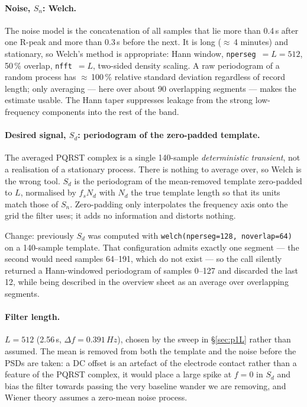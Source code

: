 \documentclass[11pt,a4paper]{article}
\newcommand{\hertz}{Hz}
\newcommand{\second}{s}
\newcommand{\percent}{\%}
\newcommand{\num}[1]{#1}
\newcommand{\numrange}[2]{#1--#2}
\newcommand{\SI}[2]{#1\,#2}
\newcommand{\change}[1]{\textcolor{black!70}{\textsf{\footnotesize #1}}}
\begin{document}
\paragraph{Noise, $S_n$: Welch.} The noise model is the concatenation of all samples that lie
more than \SI{0.4}{\second} after one R-peak and more than \SI{0.3}{\second} before the next.
It is long ($\approx$\,4 minutes) and stationary, so Welch's method is appropriate: Hann
window, \texttt{nperseg}~$=L=512$, \SI{50}{\percent} overlap, \texttt{nfft}~$=L$, two-sided
density scaling. A raw periodogram of a random process has $\approx$\,\SI{100}{\percent}
relative standard deviation regardless of record length; only averaging --- here over about
90 overlapping segments --- makes the estimate usable. The Hann taper suppresses leakage from
the strong low-frequency components into the rest of the band.

\paragraph{Desired signal, $S_d$: periodogram of the zero-padded template.} The averaged
PQRST complex is a single \num{140}-sample \emph{deterministic transient}, not a realisation
of a stationary process. There is nothing to average over, so Welch is the wrong tool. $S_d$
is the periodogram of the mean-removed template zero-padded to $L$, normalised by $f_s N_d$
with $N_d$ the true template length so that its units match those of $S_n$. Zero-padding only
interpolates the frequency axis onto the grid the filter uses; it adds no information and
distorts nothing.

\change{Change: previously $S_d$ was computed with \texttt{welch(nperseg=128, noverlap=64)}
on a \num{140}-sample template. That configuration admits exactly one segment --- the second
would need samples \numrange{64}{191}, which do not exist --- so the call silently returned a
Hann-windowed periodogram of samples \numrange{0}{127} and discarded the last \num{12},
while being described in the overview sheet as an average over overlapping segments.}

\paragraph{Filter length.} $L=512$ (\SI{2.56}{\second}, $\Delta f = \SI{0.391}{\hertz}$),
chosen by the sweep in \S\ref{sec:p1L} rather than assumed. The mean is removed from both the
template and the noise before the PSDs are taken: a DC offset is an artefact of the electrode
contact rather than a feature of the PQRST complex, it would place a large spike at $f=0$ in
$S_d$ and bias the filter towards passing the very baseline wander we are removing, and Wiener
theory assumes a zero-mean noise process.
\end{document}
